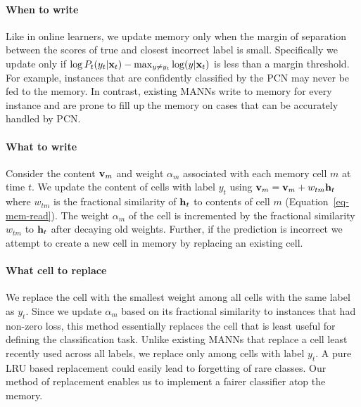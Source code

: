\documentclass[letterpaper]{article} %
\newcommand{\vek}[1]{{\bf {#1}}}
\newcommand{\vx}{{\vek{x}}}
\newcommand{\vh}{{\vek{h}}}
\newcommand{\vM}{{\vek{v}}}
\begin{document}
\paragraph{When to write}
Like in online learners, we update memory only when the margin of separation between the scores of true and closest incorrect label is small. Specifically we update only if $\log P_t(y_t|\vx_t) - \max_{y \ne y_t} \log (y | \vx_t)$ is less than a margin threshold.  For example, instances that are confidently classified by the PCN may never be fed to the memory.
In contrast,  existing MANNs write to memory for every instance and are prone to fill up the memory on cases that can be accurately handled by PCN.
\paragraph{What to write}
Consider the content $\vM_m$ and weight $\alpha_m$ associated with
each memory cell $m$ at time $t$.   We update the content of cells with label $y_t$ using $\vM_{m} = \vM_{m} + w_{tm}{\vh_t}$ where $w_{tm}$ is the fractional similarity of $\vh_t$ to contents of cell $m$ (Equation~\ref{eq-mem-read}). The weight $\alpha_m$ of the cell is incremented by the fractional similarity $w_{tm}$ to $\vh_t$ after decaying old weights.
Further, if the prediction is incorrect we attempt to create a new cell in memory  by replacing an existing cell.
\paragraph{What cell to replace} We replace the cell with the smallest weight among all cells with the same label as $y_t$. %
Since we update $\alpha_m$ based on its fractional similarity to instances that had non-zero loss, this method essentially replaces the cell that is least useful for defining the classification task.  Unlike existing MANNs that replace a cell least recently used across all labels, we replace only among cells with label $y_t$. A pure LRU based replacement could easily lead to forgetting of rare classes.  Our method of replacement enables us to implement a fairer classifier atop the memory.
\end{document}
